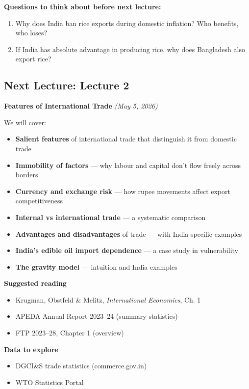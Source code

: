 \documentclass[
  letterpaper,
  DIV=11,
  numbers=noendperiod]{scrartcl}
\providecommand{\tightlist}{%
  \setlength{\itemsep}{0pt}\setlength{\parskip}{0pt}}
\begin{document}
\textbf{Questions to think about before next lecture:}

\begin{enumerate}
\def\labelenumi{\arabic{enumi}.}
\tightlist
\item
  Why does India ban rice exports during domestic inflation? Who
  benefits, who loses?
\item
  If India has absolute advantage in producing rice, why does Bangladesh
  also export rice?
\end{enumerate}

\subsection{Next Lecture: Lecture 2}\label{next-lecture-lecture-2}

\textbf{Features of International Trade} \emph{(May 5, 2026)}

We will cover:

\begin{itemize}
\tightlist
\item
  \textbf{Salient features} of international trade that distinguish it
  from domestic trade
\item
  \textbf{Immobility of factors} --- why labour and capital don't flow
  freely across borders
\item
  \textbf{Currency and exchange risk} --- how rupee movements affect
  export competitiveness
\item
  \textbf{Internal vs international trade} --- a systematic comparison
\item
  \textbf{Advantages and disadvantages} of trade --- with India-specific
  examples
\item
  \textbf{India's edible oil import dependence} --- a case study in
  vulnerability
\item
  \textbf{The gravity model} --- intuition and India examples
\end{itemize}

\textbf{Suggested reading}

\begin{itemize}
\tightlist
\item
  Krugman, Obstfeld \& Melitz, \emph{International Economics}, Ch. 1
\item
  APEDA Annual Report 2023--24 (summary statistics)
\item
  FTP 2023--28, Chapter 1 (overview)
\end{itemize}

\textbf{Data to explore}

\begin{itemize}
\tightlist
\item
  DGCI\&S trade statistics (commerce.gov.in)
\item
  WTO Statistics Portal
\end{itemize}
\end{document}
